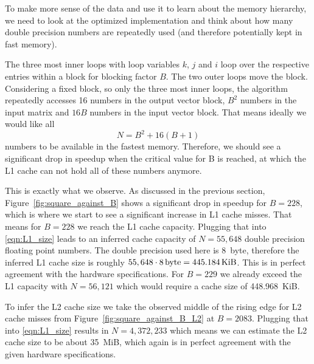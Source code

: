 \documentclass[a4paper, 11pt]{article}
\begin{document}
To make more sense of the data and use it to learn about the memory hierarchy,
we need to look at the optimized implementation and think about how many double
precision numbers are repeatedly used (and therefore potentially kept in fast
memory).

The three most inner loops with loop variables $k$, $j$ and $i$ loop over the
respective entries within a block for blocking factor $B$. The two outer loops
move the block. Considering a fixed block, so only the three most inner loops,
the algorithm repeatedly accesses 16 numbers in the output vector block, $B^2$
numbers in the input matrix and $16B$ numbers in the input vector block. That
means ideally we would like all
\begin{equation}
  N = B^2 + 16(B + 1)
  \label{eqn:L1_size}
\end{equation}
numbers to be available in
the fastest memory. Therefore, we should see a significant drop in speedup when
the critical value for B is reached, at which the L1 cache can not hold all of
these numbers anymore.

This is exactly what we observe. As discussed in the previous section,
Figure~\ref{fig:square_against_B} shows a significant drop in speedup for
$B=228$, which is where we start to see a significant increase in L1 cache
misses. That means for $B=228$ we reach the L1 cache capacity. Plugging that
into \eqref{eqn:L1_size} leads to an inferred cache capacity of $N = 55,648$
double precision floating point numbers. The double precision used here is
\SI{8}{byte}, therefore the inferred L1 cache size is roughly $55,648\cdot
\SI{8}{byte} = 445.184\,\textup{KiB}$. This is in perfect agreement with the
hardware specifications. For $B=229$ we already exceed the L1 capacity with
$N=56,121$ which would require a cache size of \SI{448.968}{KiB}.

To infer the L2 cache size we take the observed middle of the rising edge for
L2 cache misses from Figure~\ref{fig:square_against_B_L2} at $B=2083$. Plugging
that into \eqref{eqn:L1_size} results in $N = 4,372,233$ which means we can
estimate the L2 cache size to be about \SI{35}{MiB}, which again is in perfect
agreement with the given hardware specifications.
\end{document}
